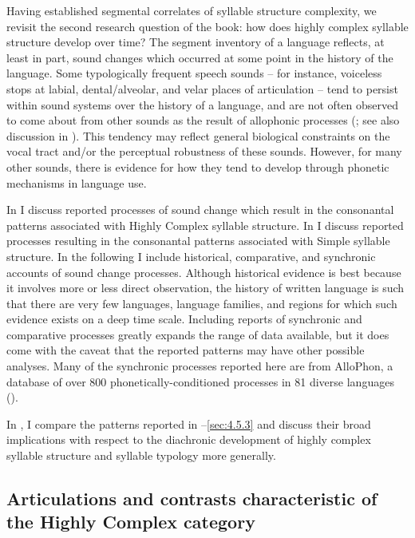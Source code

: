   Having established segmental correlates of syllable structure complexity, we revisit the second research question of the book: how does highly complex syllable structure develop over time? The segment inventory of a language reflects, at least in part, sound changes which occurred at some point in the history of the language. Some typologically frequent speech sounds -- for instance, voiceless stops at labial, dental/alveolar, and velar places of articulation -- tend to persist within sound systems over the history of a language, and are not often observed to come about from other sounds as the result of allophonic processes (\citealt{Bybee2015a}; see also discussion in ). This tendency may reflect general biological constraints on the vocal tract and/or the perceptual robustness of these sounds. However, for many other sounds, there is evidence for how they tend to develop through phonetic mechanisms in language use. 

  In  I discuss reported processes of sound change which result in the consonantal patterns associated with Highly Complex syllable structure. In  I discuss reported processes resulting in the consonantal patterns associated with Simple syllable structure. In the following I include historical, comparative, and synchronic accounts of sound change processes. Although historical evidence is best because it involves more or less direct observation, the history of written language is such that there are very few languages, language families, and regions for which such evidence exists on a deep time scale. Including reports of synchronic and comparative processes greatly expands the range of data available, but it does come with the caveat that the reported patterns may have other possible analyses. Many of the synchronic processes reported here are from AlloPhon, a database of over 800 phonetically-conditioned processes in 81 diverse languages (\citealt{BybeeEasterday2019}).

  In , I compare the patterns reported in --\ref{sec:4.5.3} and discuss their broad implications with respect to the diachronic development of highly complex syllable structure and syllable typology more generally.

\subsection{Articulations and contrasts characteristic of the Highly Complex category} \label{sec:4.5.2}

